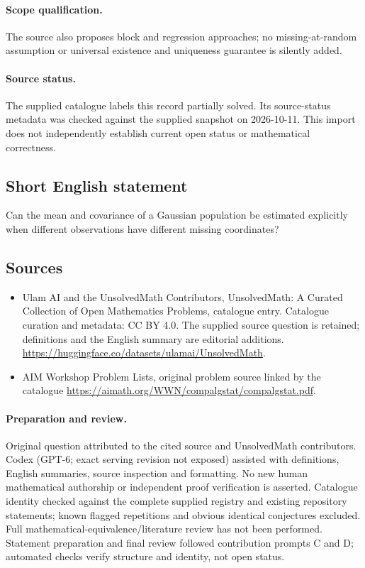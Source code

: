 \documentclass[11pt]{article}
\begin{document}
\paragraph{Scope qualification.}
The source also proposes block and regression approaches; no missing-at-random assumption or universal existence and uniqueness guarantee is silently added.
\paragraph{Source status.}
The supplied catalogue labels this record partially solved. Its source-status metadata was checked against the supplied snapshot on 2026-10-11. This import does not independently establish current open status or mathematical correctness.
\subsection{Short English statement}
Can the mean and covariance of a Gaussian population be estimated explicitly when different observations have different missing coordinates?
\subsection{Sources}
\begin{itemize}
\item[S1] Ulam AI and the UnsolvedMath Contributors, UnsolvedMath: A Curated Collection of Open Mathematics Problems, catalogue entry. Catalogue curation and metadata: CC BY 4.0. The supplied source question is retained; definitions and the English summary are editorial additions.
\url{https://huggingface.co/datasets/ulamai/UnsolvedMath}.
\item[S2] AIM Workshop Problem Lists, original problem source linked by the catalogue
\url{https://aimath.org/WWN/compalgstat/compalgstat.pdf}.
\end{itemize}
\paragraph{Preparation and review.}
Original question attributed to the cited source and UnsolvedMath contributors. Codex (GPT-6; exact serving revision not exposed) assisted with definitions, English summaries, source inspection and formatting. No new human mathematical authorship or independent proof verification is asserted. Catalogue identity checked against the complete supplied registry and existing repository statements; known flagged repetitions and obvious identical conjectures excluded. Full mathematical-equivalence/literature review has not been performed. Statement preparation and final review followed contribution prompts C and D; automated checks verify structure and identity, not open status.
\label{end:statement}
\end{document}
